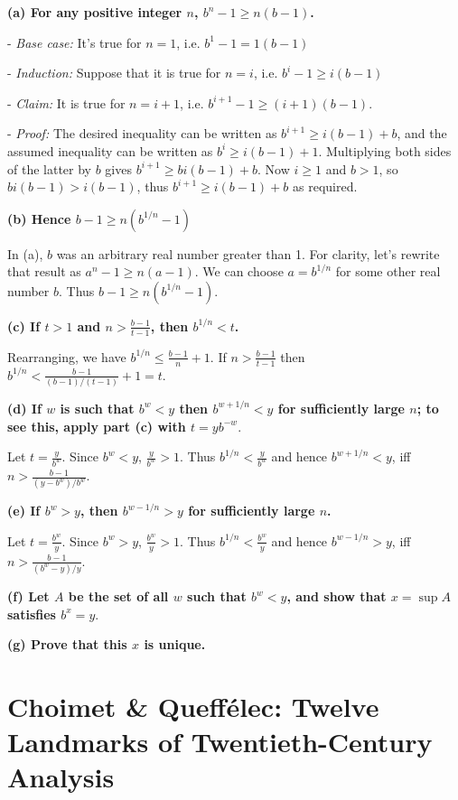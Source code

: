 \textbf{(a) For any positive integer $n$, $b^n - 1 \geq n(b-1)$.}

- \textit{Base case:} It's true for $n=1$, i.e. $b^1 - 1 = 1(b-1)$

- \textit{Induction:} Suppose that it is true for $n=i$, i.e. $b^i - 1 \geq i(b-1)$

    - \textit{Claim:} It is true for $n=i+1$, i.e. $b^{i+1} - 1 \geq (i+1)(b-1)$.

    - \textit{Proof:} The desired inequality can be written as $b^{i+1} \geq i(b-1) +
      b$, and the assumed inequality can be written as $b^i \geq i(b-1) +
      1$. Multiplying both sides of the latter by $b$ gives $b^{i+1} \geq
      bi(b-1) + b$. Now $i \geq 1$ and $b>1$, so $bi(b-1) > i(b-1)$, thus
      $b^{i+1} \geq i(b-1) + b$ as required.


\textbf{(b) Hence $b - 1 \geq n(b^{1/n} - 1)$}

In (a), $b$ was an arbitrary real number greater than 1. For clarity, let's
rewrite that result as $a^n - 1 \geq n(a-1)$. We can choose $a=b^{1/n}$ for
some other real number $b$. Thus $b - 1 \geq n(b^{1/n}-1)$.

\textbf{(c) If $t > 1$ and $n > \frac{b-1}{t-1}$, then $b^{1/n} < t$.}

Rearranging, we have $b^{1/n} \leq \frac{b-1}{n} + 1$. If $n > \frac{b-1}{t-1}$
then $b^{1/n} < \frac{b-1}{(b-1)/(t-1)} + 1 = t$.

\textbf{(d) If $w$ is such that $b^w < y$ then $b^{w + 1/n} < y$ for sufficiently
large $n$; to see this, apply part (c) with $t = yb^{-w}.$}

Let $t = \frac{y}{b^w}$. Since $b^w < y$, $\frac{y}{b^w} > 1$. Thus $b^{1/n} <
\frac{y}{b^w}$ and hence $b^{w + 1/n} < y$, iff $n > \frac{b-1}{(y -
b^w)/b^w}$.

\textbf{(e) If $b^w > y$, then $b^{w - 1/n} > y$ for sufficiently large $n$.}

Let $t = \frac{b^w}{y}$. Since $b^w > y$, $\frac{b^w}{y} > 1$. Thus $b^{1/n} <
\frac{b^w}{y}$ and hence $b^{w - 1/n} > y$, iff $n > \frac{b-1}{(b^w -
y)/y}$.


\textbf{(f) Let $A$ be the set of all $w$ such that $b^w < y$, and show that $x =
\sup A$ satisfies $b^x = y.$}

\textbf{(g) Prove that this $x$ is unique.}
\newpage
\section{Choimet \& Queffélec: Twelve Landmarks of Twentieth-Century Analysis}

